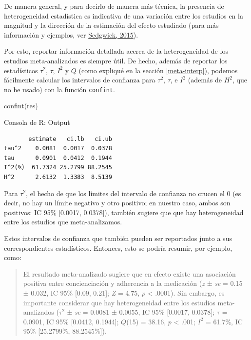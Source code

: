 \documentclass[
  bookmarksnumbered]{article}
\newenvironment{Shaded}{\begin{snugshade}}{\end{snugshade}}
\newcommand{\FunctionTok}[1]{\textcolor[rgb]{0.39,0.29,0.61}{#1}}
\newcommand{\NormalTok}[1]{\textcolor[rgb]{0.12,0.11,0.11}{#1}}
\begin{document}
De manera general, y para decirlo de manera más técnica, la presencia de heterogeneidad estadística es indicativa de una variación entre los estudios en la magnitud y la dirección de la estimación del efecto estudiado (para más información y ejemplos, ver \protect\hyperlink{ref-sedgwickMetaanalysesWhatHeterogeneity2015}{Sedgwick, 2015}).

Por esto, reportar información detallada acerca de la heterogeneidad de los estudios meta-analizados es siempre útil. De hecho, además de reportar los estadísticos \(\tau^2\), \(\tau\), \(I^2\) y \(Q\) (como expliqué en la sección \ref{meta-interp}), podemos fácilmente calcular los intervalos de confianza para \(\tau^2\), \(\tau\), e \(I^2\) (además de \(H^2\), que no he usado) con la función \texttt{confint}.

\begin{Shaded}
\begin{Highlighting}[]
\FunctionTok{confint}\NormalTok{(res)}
\end{Highlighting}
\end{Shaded}

\begin{ROut}{Consola de R: Output~\thetcbcounter}
                \begin{footnotesize}
                \begin{verbatim} 
       estimate   ci.lb   ci.ub 
tau^2    0.0081  0.0017  0.0378 
tau      0.0901  0.0412  0.1944 
I^2(%)  61.7324 25.2799 88.2545 
H^2      2.6132  1.3383  8.5139 
 \end{verbatim}
                \end{footnotesize}
                \end{ROut}

Para \(\tau^2\), el hecho de que los límites del intervalo de confianza no crucen el 0 (es decir, no hay un límite negativo y otro positivo; en nuestro caso, ambos son positivos: IC 95\% {[}0.0017, 0.0378{]}), también sugiere que que hay heterogeneidad entre los estudios que meta-analizamos.

Estos intervalos de confianza que también pueden ser reportados junto a sus correspondientes estadísticos. Entonces, esto se podría resumir, por ejemplo, como:

\begin{quote}
El resultado meta-analizado sugiere que en efecto existe una asociación positiva entre concienciación y adherencia a la medicación (\emph{z} ± \emph{se} = 0.15 ± 0.032, IC 95\% {[}0.09, 0.21{]}; \emph{Z} = 4.75, \(p\) \textless{} .0001). Sin embargo, es importante considerar que hay heterogeneidad entre los estudios meta-analizados (\(\tau^2\) ± \emph{se} = 0.0081 ± 0.0055, IC 95\% {[}0.0017, 0.0378{]}; \(\tau\) = 0.0901, IC 95\% {[}0.0412, 0.1944{]}; \(Q\)(15) = 38.16, \(p\) \textless{} .001; \(I^2\) = 61.7\%, IC 95\% {[}25.2799\%, 88.2545\%{]}).
\end{quote}
\end{document}

